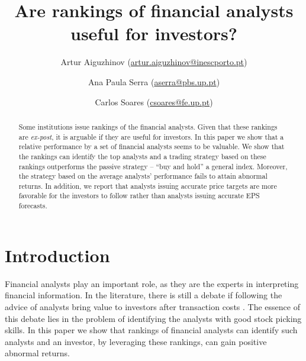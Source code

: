 \documentclass{article}\usepackage[]{graphicx}\usepackage[]{color}
\begin{document}
\title{Are rankings of financial analysts useful for investors?}
 \author[1,2]{ Artur Aiguzhinov (\href{mailto:artur.aiguzhinov@inescporto.pt}{artur.aiguzhinov@inescporto.pt})}
 \author[1,3]{ Ana Paula Serra (\href{mailto:aserra@pbs.up.pt}{aserra@pbs.up.pt})}
 \author[2,4]{Carlos Soares (\href{mailto:csoares@fe.up.pt}{csoares@fe.up.pt})}



\maketitle
\begin{abstract}
Some institutions issue rankings of the financial analysts. Given that these rankings are \textit{ex-post}, it is arguable if they are useful for investors. In this paper we show that a relative performance by a set of financial analysts seems to be valuable. We show that the rankings can identify the top analysts and a trading strategy based on these rankings outperforms the passive strategy -- ``buy and hold'' a general index. Moreover, the strategy based on the average analysts' performance fails to attain abnormal returns. In addition, we report that analysts issuing accurate price targets are more favorable for the investors  to follow rather than analysts issuing accurate EPS forecasts. %
\end{abstract}

\section{Introduction}
\label{sec:intro}


Financial analysts play an important role, as they are the experts in interpreting financial information. In the literature, there is still a debate if following the  advice of analysts bring value to investors after transaction costs \citep{womack1996,mikhail2004sae,li2005persistence}. The essence of this debate lies in the problem of identifying the analysts with good stock picking skills. In this paper we show that rankings of financial analysts can identify such analysts and an investor, by leveraging these rankings, can gain positive abnormal returns.
\end{document}
